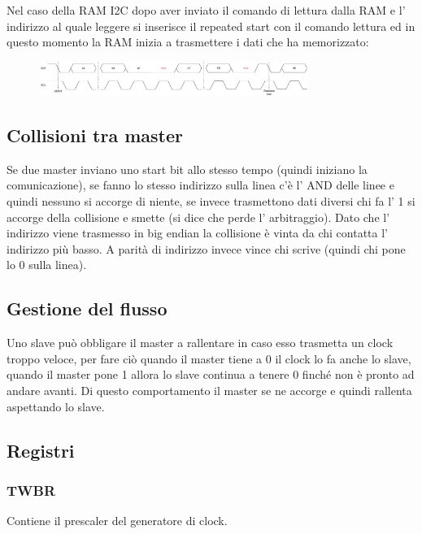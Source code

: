 Nel caso della RAM I2C dopo aver inviato il comando di lettura dalla RAM e l' indirizzo al quale leggere si inserisce il repeated start con il comando lettura ed in questo momento la RAM inizia a trasmettere  i dati che ha memorizzato:
\begin{figure}[H]
    \centering
    \includegraphics[width=330px]{images/24_I2C-TWI/i2c_repeated_start.png}
\end{figure}

\subsection{Collisioni tra master}
Se due master inviano uno start bit allo stesso tempo (quindi iniziano la comunicazione), se fanno lo stesso indirizzo sulla linea c'è l' AND delle linee e quindi nessuno si accorge di niente, se invece trasmettono dati diversi chi fa l' 1 si accorge della collisione e smette (si dice che perde l' arbitraggio).
Dato che l' indirizzo viene trasmesso in big endian la collisione è vinta da chi contatta l' indirizzo più basso.
A parità di indirizzo invece vince chi scrive (quindi chi pone lo 0 sulla linea).

\subsection{Gestione del flusso}
Uno slave può obbligare il master a rallentare in caso esso trasmetta un clock troppo veloce, per fare ciò quando il master tiene a 0 il clock lo fa anche lo slave, quando il master pone 1 allora lo slave continua a tenere 0 finché non è pronto ad andare avanti.
Di questo comportamento il master se ne accorge e quindi rallenta aspettando lo slave.

\subsection{Registri}
\subsubsection{TWBR}
Contiene il prescaler del generatore di clock.

